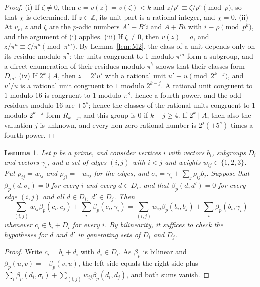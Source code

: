 \documentclass[11pt]{article}
\newtheorem{lemma}[theorem]{Lemma}
\newcommand{\Z}{\mathbb{Z}}
\begin{document}
\begin{proof}
(i) If $\zeta\neq0$, then $e=v(z)=v(\zeta)<k$ and $z/p^e\equiv\zeta/p^e\pmod p$, so that $\chi$ is determined. If $z\in\Z$, its unit part is a rational integer, and $\chi=0$. (ii) At $v_r$, $z$ and $\zeta$ are the $p$-adic numbers $A'+B'i$ and $A+Bi$ with $i\equiv\rho\pmod{p^k}$, and the argument of (i) applies. (iii) If $\zeta\neq0$, then $v(z)=a$, and $z/\pi^a\equiv\zeta/\pi^a\pmod{\pi^m}$. By Lemma~\ref{lem:M2}, the class of a unit depends only on its residue modulo $\pi^7$; the units congruent to $1$ modulo $\pi^m$ form a subgroup, and a direct enumeration of their residues modulo $\pi^7$ shows that their classes form $D_m$. (iv) If $2^k\nmid A$, then $z=2^ju'$ with a rational unit $u'\equiv u\pmod{2^{k-j}}$, and $u'/u$ is a rational unit congruent to $1$ modulo $2^{k-j}$. A rational unit congruent to $1$ modulo $16$ is congruent to $1$ modulo $\pi^8$, hence a fourth power, and the odd residues modulo $16$ are $\pm5^s$; hence the classes of the rational units congruent to $1$ modulo $2^{k-j}$ form $R_{k-j}$, and this group is $0$ if $k-j\geq4$. If $2^k\mid A$, then also the valuation $j$ is unknown, and every non-zero rational number is $2^j(\pm5^s)$ times a fourth power.
\end{proof}

\begin{lemma}\label{lem:envelope}
Let $p$ be a prime, and consider vertices $i$ with vectors $b_i$, subgroups $D_i$ and vectors $\gamma_i$, and a set of edges $(i,j)$ with $i<j$ and weights $w_{ij}\in\{1,2,3\}$. Put $\rho_{ij}=w_{ij}$ and $\rho_{ji}=-w_{ij}$ for the edges, and $\sigma_i=\gamma_i+\sum_j\rho_{ij}b_j$. Suppose that $\beta_p(d,\sigma_i)=0$ for every $i$ and every $d\in D_i$, and that $\beta_p(d,d')=0$ for every edge $(i,j)$ and all $d\in D_i$, $d'\in D_j$. Then
\[
\sum_{(i,j)}w_{ij}\beta_p(c_i,c_j)+\sum_i\beta_p(c_i,\gamma_i)=\sum_{(i,j)}w_{ij}\beta_p(b_i,b_j)+\sum_i\beta_p(b_i,\gamma_i)
\]
whenever $c_i\in b_i+D_i$ for every $i$. By bilinearity, it suffices to check the hypotheses for $d$ and $d'$ in generating sets of $D_i$ and $D_j$.
\end{lemma}

\begin{proof}
Write $c_i=b_i+d_i$ with $d_i\in D_i$. As $\beta_p$ is bilinear and $\beta_p(u,v)=-\beta_p(v,u)$, the left side equals the right side plus $\sum_i\beta_p(d_i,\sigma_i)+\sum_{(i,j)}w_{ij}\beta_p(d_i,d_j)$, and both sums vanish.
\end{proof}
\end{document}
